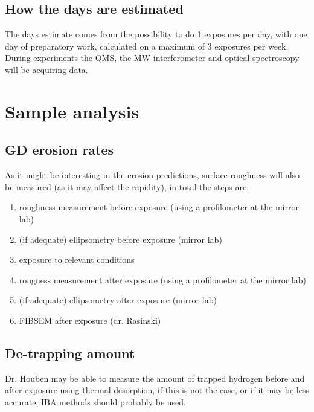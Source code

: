 \documentclass{article}
\begin{document}
\subsection*{How the days are estimated}
The days estimate comes from the possibility to do 1 exposures per day,
with one day of preparatory work, calculated on a maximum of 3 exposures per week.
During experiments the QMS, the MW interferometer and optical spectroscopy will
be acquiring data.
\section{Sample analysis}
\subsection*{GD erosion rates}
As it might be interesting in the erosion predictions, surface roughness will also be measured
(as it may affect the rapidity), in total the steps are:
\begin{enumerate}
    \item roughness measurement before exposure (using a profilometer at the mirror lab)
    \item (if adequate) ellipsometry before exposure (mirror lab)
    \item exposure to relevant conditions
    \item rougness measurement after exposure (using a profilometer at the mirror lab)
    \item (if adequate) ellipsometry after exposure (mirror lab)
    \item FIBSEM after exposure (dr. Rasinski)
\end{enumerate}
\subsection*{De-trapping amount}
Dr. Houben may be able to measure the amount of trapped hydrogen before and
after exposure using thermal desorption, if this is not the case, or if it may
be less accurate, IBA methods should probably be used.


\end{document}
